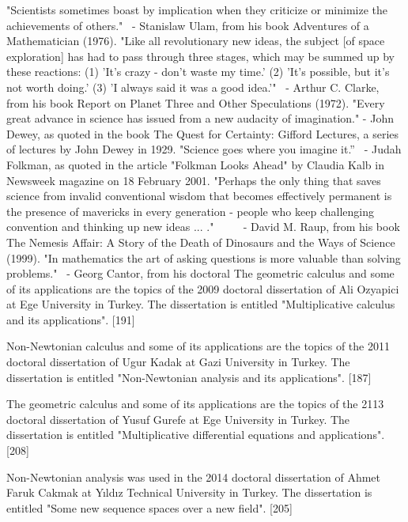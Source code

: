 \documentclass[12pt]{article}
\begin{document}
"Scientists sometimes boast by implication when they criticize or minimize the achievements of others."  - Stanislaw Ulam, from his book Adventures of a Mathematician (1976).
"Like all revolutionary new ideas, the subject [of space exploration] has had to pass through three stages, which may be summed up by these reactions: (1) 'It's crazy - don't waste my time.' (2) 'It's possible, but it's not worth doing.' (3) 'I always said it was a good idea.'"  - Arthur C. Clarke, from his book Report on Planet Three and Other Speculations (1972).
"Every great advance in science has issued from a new audacity of imagination." - John Dewey, as quoted in the book The Quest for Certainty: Gifford Lectures, a series of lectures by John Dewey in 1929.
"Science goes where you imagine it.”  - Judah Folkman, as quoted in the article "Folkman Looks Ahead" by Claudia Kalb in Newsweek magazine on 18 February 2001. 
"Perhaps the only thing that saves science from invalid conventional wisdom that becomes effectively permanent is the presence of mavericks in every generation - people who keep challenging convention and thinking up new ideas ... ."      - David M. Raup, from his book The Nemesis Affair: A Story of the Death of Dinosaurs and the Ways of Science (1999).
"In mathematics the art of asking questions is more valuable than solving problems."  - Georg Cantor, from his doctoral The geometric calculus and some of its applications are the topics of the 2009 doctoral dissertation of Ali Ozyapici at Ege University in Turkey. The dissertation is entitled "Multiplicative calculus and its applications". [191]  

Non-Newtonian calculus and some of its applications are the topics of the 2011 doctoral dissertation of Ugur Kadak at Gazi University in Turkey. The dissertation is entitled "Non-Newtonian analysis and its applications". [187]

The geometric calculus and some of its applications are the topics of the 2113 doctoral dissertation of Yusuf Gurefe at Ege University in Turkey. The dissertation is entitled "Multiplicative differential equations and applications". [208]

Non-Newtonian analysis was used in the 2014 doctoral dissertation of Ahmet Faruk Cakmak at Yıldız Technical University in Turkey. The dissertation is entitled "Some new sequence spaces over a new field". [205]
\end{document}
